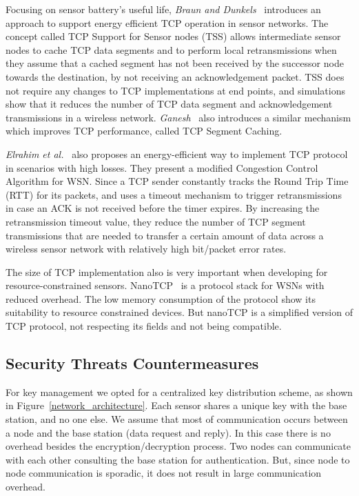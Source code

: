 Focusing on sensor battery's useful life, \textit{Braun and Dunkels}~\cite{Braun:2007} introduces an approach to support energy efficient TCP operation in sensor networks.
The concept called TCP Support for Sensor nodes (TSS) allows intermediate sensor nodes to cache TCP data segments and to perform local retransmissions when they assume that a cached segment has not been received by the successor node towards the destination, by not receiving an acknowledgement packet.
TSS does not require any changes to TCP implementations at end points, and simulations show that it reduces the number of TCP data segment and acknowledgement transmissions in a wireless network.
\textit{Ganesh}~\cite{Ganesh:2009} also introduces a similar mechanism which improves TCP performance, called TCP Segment Caching.

\textit{Elrahim et al.}~\cite{Elrahim:2011} also proposes an energy-efficient way to implement TCP protocol in scenarios with high losses.
They present a modified Congestion Control Algorithm for WSN. 
Since a TCP sender constantly tracks the Round Trip Time (RTT) for its packets, and uses a timeout mechanism to trigger retransmissions in case an ACK is not received before the timer expires.
By increasing the retransmission timeout value, they reduce the number of TCP segment transmissions that are needed to transfer a certain amount of data across a wireless sensor network with relatively high bit/packet error rates.

The size of TCP implementation also is very important when developing for resource-constrained sensors.
NanoTCP~\cite{Jardak:2008}  is a protocol stack for WSNs with reduced overhead.
The low memory consumption of the protocol show its suitability to resource constrained devices.
But nanoTCP is a simplified version of TCP protocol, not respecting its fields and not being compatible.

\subsection{Security Threats Countermeasures}
For key management we opted for a centralized key distribution scheme, as shown in Figure~\ref{network_architecture}.
Each sensor shares a unique key with the base station, and no one else.
We assume that most of communication occurs between a node and the base station (data request and reply).
In this case there is no overhead besides the encryption/decryption process.
Two nodes can communicate with each other consulting the base station for authentication.
But, since node to node communication is sporadic, it does not result in large communication overhead.

